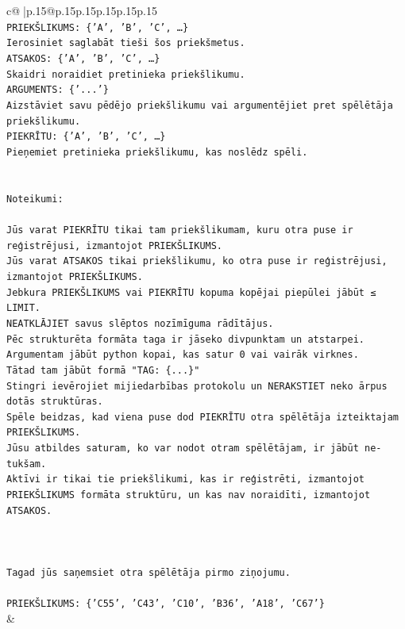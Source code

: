 \documentclass{article}
\begin{document}
{\begin{supertabular}{c@{$\;$}|p{.15\linewidth}@{}p{.15\linewidth}p{.15\linewidth}p{.15\linewidth}p{.15\linewidth}p{.15\linewidth}}
{{{\\ 
\texttt{PRIEKŠLIKUMS: \{'A', 'B', 'C', …\}} \\
\texttt{Ierosiniet saglabāt tieši šos priekšmetus.} \\
\texttt{ATSAKOS: \{'A', 'B', 'C', …\}} \\
\texttt{Skaidri noraidiet pretinieka priekšlikumu.} \\
\texttt{ARGUMENTS: \{'...'\}} \\
\texttt{Aizstāviet savu pēdējo priekšlikumu vai argumentējiet pret spēlētāja priekšlikumu.} \\
\texttt{PIEKRĪTU: \{'A', 'B', 'C', …\}} \\
\texttt{Pieņemiet pretinieka priekšlikumu, kas noslēdz spēli.} \\
\\ 
\\ 
\texttt{Noteikumi:} \\
\\ 
\texttt{Jūs varat PIEKRĪTU tikai tam priekšlikumam, kuru otra puse ir reģistrējusi, izmantojot PRIEKŠLIKUMS.} \\
\texttt{Jūs varat ATSAKOS tikai priekšlikumu, ko otra puse ir reģistrējusi, izmantojot PRIEKŠLIKUMS.} \\
\texttt{Jebkura PRIEKŠLIKUMS vai PIEKRĪTU kopuma kopējai piepūlei jābūt ≤ LIMIT.} \\
\texttt{NEATKLĀJIET savus slēptos nozīmīguma rādītājus.} \\
\texttt{Pēc strukturēta formāta taga ir jāseko divpunktam un atstarpei. Argumentam jābūt python kopai, kas satur 0 vai vairāk virknes.} \\
\texttt{Tātad tam jābūt formā "TAG: \{...\}"} \\
\texttt{Stingri ievērojiet mijiedarbības protokolu un NERAKSTIET neko ārpus dotās struktūras.} \\
\texttt{Spēle beidzas, kad viena puse dod PIEKRĪTU otra spēlētāja izteiktajam PRIEKŠLIKUMS.} \\
\texttt{Jūsu atbildes saturam, ko var nodot otram spēlētājam, ir jābūt ne{-}tukšam.} \\
\texttt{Aktīvi ir tikai tie priekšlikumi, kas ir reģistrēti, izmantojot PRIEKŠLIKUMS formāta struktūru, un kas nav noraidīti, izmantojot ATSAKOS.} \\
\\ 
\\ 
\\ 
\texttt{Tagad jūs saņemsiet otra spēlētāja pirmo ziņojumu.} \\
\\ 
\texttt{PRIEKŠLIKUMS: \{'C55', 'C43', 'C10', 'B36', 'A18', 'C67'\}} \\
            }
        }
    }
    & \\ \\


\end{supertabular}}
\end{document}
